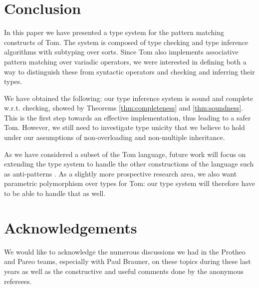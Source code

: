 \documentclass{eptcs}
\newcommand{\tom}{\textsf{Tom}\xspace}
\begin{document}
\section{Conclusion}
\label{sec:conclusion}

In this paper we have presented a type system for the pattern matching
constructs of \tom. The system is composed of type
checking and type inference algorithms with subtyping over sorts. Since \tom
also implements associative pattern matching over variadic operators, we were 
interested in defining both a way to distinguish these from syntactic
operators and checking and inferring their types.

We have obtained the following: our type inference system is sound and complete
w.r.t. checking, showed by Theorems \ref{thm:completeness} and \ref{thm:soundness}. This
is the first step towards an effective implementation, thus leading to a safer
\tom.
However, we still need to investigate type unicity that we believe to hold under our assumptions of non-overloading and non-multiple inheritance.

As we have considered a subset of the \tom language, future work will 
focus on extending the type system to handle the other constructions of the
language such as anti-patterns \cite{KirchnerKM-2007,kopetz:08}. 
As a slightly more prospective research area, we also want parametric polymorphism over types for \tom: our type system will therefore have
to be able to handle that as well.  

\section*{Acknowledgements} We would like to acknowledge the numerous discussions we had
in the Protheo and Pareo teams, especially with Paul Brauner, on these topics during these
last years as well as the constructive and useful comments done by the anonymous
refereees.



\end{document}
